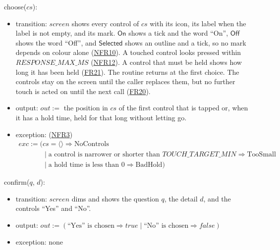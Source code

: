 \documentclass[10pt, titlepage]{article}
\newcommand{\srsurl}{https://team-hindsight.github.io/ophthamology-game/SRS/SRS.pdf}
\newcommand{\srsitemref}[2]{\href{\srsurl\#nameddest=#1}{#2}}
\newcommand{\T}[1]{\mathit{#1}}          %
\newcommand{\V}[1]{\mathsf{#1}}          %
\newcommand{\out}{\mathit{out}}
\newcommand{\exc}{\mathit{exc}}
\newcommand{\true}{\mathit{true}}
\newcommand{\false}{\mathit{false}}
\begin{document}
\begin{samepage}
\noindent choose($\T{cs}$):
\begin{itemize}
\item transition: $\T{screen}$ shows every control of $\T{cs}$ with its icon,
  its label when the label is not empty, and its mark. $\V{On}$ shows a tick
  and the word ``On'', $\V{Off}$ shows the word ``Off'', and $\V{Selected}$
  shows an outline and a tick, so no mark depends on colour alone
  (\srsitemref{NFR_Colour}{NFR10}). A touched control looks pressed within
  $\T{RESPONSE\_MAX\_MS}$ (\srsitemref{NFR_Responsiveness}{NFR12}). A control
  that must be held shows how long it has been held
  (\srsitemref{FR_HoldSkip}{FR21}). The routine returns at the first choice.
  The controls stay on the screen until the caller replaces them, but no
  further touch is acted on until the next call
  (\srsitemref{FR_IgnoreRepeatedTouches}{FR20}).
\item output: $\out :=$ the position in $\T{cs}$ of the first control that is
  tapped or, when it has a hold time, held for that long without letting go.
\item exception: (\srsitemref{NFR_TouchTarget}{NFR3})
  \[\begin{array}{l}
  \exc := (\T{cs} = \langle\rangle \Rightarrow \text{NoControls}\\
  \phantom{\exc := (}\mid \text{a control is narrower or shorter than }
  \T{TOUCH\_TARGET\_MIN} \Rightarrow \text{TooSmall}\\
  \phantom{\exc := (}\mid \text{a hold time is less than 0} \Rightarrow
  \text{BadHold})
  \end{array}\]
\end{itemize}
\end{samepage}
\par\pagebreak[0]

\begin{samepage}
\noindent confirm($q$, $d$):
\begin{itemize}
\item transition: $\T{screen}$ dims and shows the question $q$, the detail
  $d$, and the controls ``Yes'' and ``No''.
\item output: $\out := (\text{``Yes'' is chosen} \Rightarrow \true \mid
  \text{``No'' is chosen} \Rightarrow \false)$
\item exception: none
\end{itemize}
\end{samepage}
\par\pagebreak[0]
\end{document}
